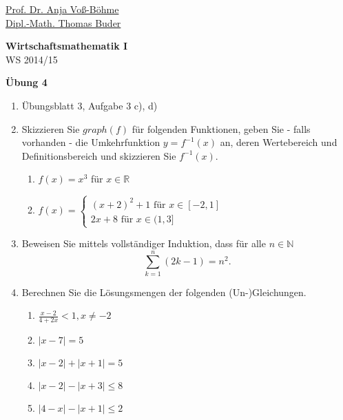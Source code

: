\documentclass[12pt,a4paper]{scrreprt}
\newcommand{\N}{\mathds{N}}
\newcommand{\R}{\mathds{R}}
\begin{document}
 
\begin{flushleft}
\href{mailto:anja.voss-boehme@htw-dresden.de}{Prof. Dr. Anja Voß-Böhme} \\
\href{mailto:buder@htw-dresden.de}{Dipl.-Math. Thomas Buder}
\end{flushleft}

\begin{center}
\large{\textbf{ Wirtschaftsmathematik I}} \\
WS 2014/15 \end{center}

\begin{center}\large{\textbf{ Übung 4 }} \end{center}

\bigskip
\begin{enumerate}
\item Übungsblatt 3, Aufgabe 3 c), d)
\item Skizzieren Sie $graph(f)$ für folgenden Funktionen, geben Sie  - falls vorhanden - die Umkehrfunktion $y=f^{-1}(x)$ an,  deren Wertebereich und Definitionsbereich und skizzieren Sie $f^{-1}(x)$.
		\begin{enumerate}
			\item $f(x)=x^3$ für $x \in \R$
			\item $f(x)= \begin{cases}
													(x+2)^2+1 \text{ für  } x \in [-2,1] \\
													2x+8 \text{ für  } x \in (1,3]
										\end{cases}$
			\end{enumerate}
\item Beweisen Sie mittels vollständiger Induktion, dass für alle $n \in \N$ \[ \sum\limits_{k=1}^n (2k-1) = n^2.\]
\item Berechnen Sie die Lösungsmengen der folgenden (Un-)Gleichungen.
			\begin{enumerate}
			  \item $\frac{x-2}{4+2x} < 1,  x \neq -2$
				\item $|x-7| = 5$
				\item $|x-2| + |x+1| = 5$
				\item $|x - 2| - |x + 3| \leq 8$
				\item $|4 - x| - |x + 1| \leq 2$



\end{enumerate}
\end{enumerate}
\end{document}
